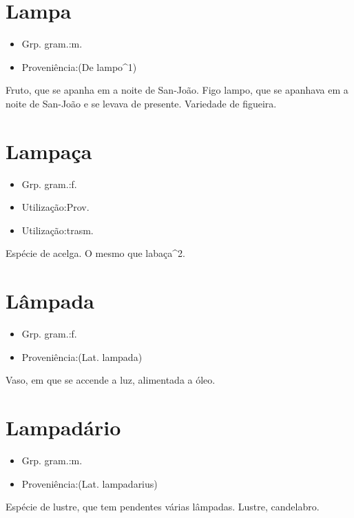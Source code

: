 \section{Lampa}
\begin{itemize}
\item {Grp. gram.:m.}
\end{itemize}
\begin{itemize}
\item {Proveniência:(De \textunderscore lampo\textunderscore ^1)}
\end{itemize}
Fruto, que se apanha em a noite de San-João.
Figo lampo, que se apanhava em a noite de San-João e se levava de presente.
Variedade de figueira.
\section{Lampaça}
\begin{itemize}
\item {Grp. gram.:f.}
\end{itemize}
\begin{itemize}
\item {Utilização:Prov.}
\end{itemize}
\begin{itemize}
\item {Utilização:trasm.}
\end{itemize}
Espécie de acelga.
O mesmo que \textunderscore labaça\textunderscore ^2.
\section{Lâmpada}
\begin{itemize}
\item {Grp. gram.:f.}
\end{itemize}
\begin{itemize}
\item {Proveniência:(Lat. \textunderscore lampada\textunderscore )}
\end{itemize}
Vaso, em que se accende a luz, alimentada a óleo.
\section{Lampadário}
\begin{itemize}
\item {Grp. gram.:m.}
\end{itemize}
\begin{itemize}
\item {Proveniência:(Lat. \textunderscore lampadarius\textunderscore )}
\end{itemize}
Espécie de lustre, que tem pendentes várias lâmpadas.
Lustre, candelabro.
